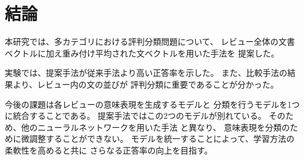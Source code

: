 \documentclass{ttisummary}
\begin{document}
%



\section{結論}

本研究では、多カテゴリにおける評判分類問題について、
レビュー全体の文書ベクトルに加え重み付け平均された文ベクトルを用いた手法を
提案した。

実験では、提案手法が従来手法\cite{fujitani15}より高い正答率を示した。
また、比較手法の結果より、レビュー内の文の並びが
評判分類に重要であることが分かった。

今後の課題は各レビューの意味表現を生成するモデルと
分類を行うモデルを1つに統合することである。
提案手法ではこの2つのモデルが別れている。
そのため、他のニューラルネットワークを用いた手法
\cite{nal14,rie14,duyu15}と異なり、
意味表現を分類のために微調整することができない。
モデルを統一することによって、学習方法の柔軟性を高めると共に
さらなる正答率の向上を目指す。
\end{document}
